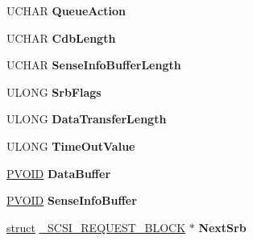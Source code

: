 \begin{DoxyCompactItemize}
U\+C\+H\+AR {\bfseries Queue\+Action}
\item 
\mbox{\label{struct___s_c_s_i___r_e_q_u_e_s_t___b_l_o_c_k_a5e64084a235d1162e8384fbf95c19304}} 
U\+C\+H\+AR {\bfseries Cdb\+Length}
\item 
\mbox{\label{struct___s_c_s_i___r_e_q_u_e_s_t___b_l_o_c_k_a3a9479a0667f96dd8bac70738a4e7a2c}} 
U\+C\+H\+AR {\bfseries Sense\+Info\+Buffer\+Length}
\item 
\mbox{\label{struct___s_c_s_i___r_e_q_u_e_s_t___b_l_o_c_k_ae175841aeb376125a20fbd7c4284d836}} 
U\+L\+O\+NG {\bfseries Srb\+Flags}
\item 
\mbox{\label{struct___s_c_s_i___r_e_q_u_e_s_t___b_l_o_c_k_a9375bacf3daa8bdd4a3a6d8bbcdde35f}} 
U\+L\+O\+NG {\bfseries Data\+Transfer\+Length}
\item 
\mbox{\label{struct___s_c_s_i___r_e_q_u_e_s_t___b_l_o_c_k_a206b7a18ee9ff76c165da4921c378527}} 
U\+L\+O\+NG {\bfseries Time\+Out\+Value}
\item 
\mbox{\label{struct___s_c_s_i___r_e_q_u_e_s_t___b_l_o_c_k_a40294e85339c4e9d60b66785c0459424}} 
\hyperlink{interfacevoid}{P\+V\+O\+ID} {\bfseries Data\+Buffer}
\item 
\mbox{\label{struct___s_c_s_i___r_e_q_u_e_s_t___b_l_o_c_k_a6f65421d840f698deecd5e5e8fc04e4c}} 
\hyperlink{interfacevoid}{P\+V\+O\+ID} {\bfseries Sense\+Info\+Buffer}
\item 
\mbox{\label{struct___s_c_s_i___r_e_q_u_e_s_t___b_l_o_c_k_ad55cd525e55371df4cec550549d2bdac}} 
\hyperlink{interfacestruct}{struct} \hyperlink{struct___s_c_s_i___r_e_q_u_e_s_t___b_l_o_c_k}{\+\_\+\+S\+C\+S\+I\+\_\+\+R\+E\+Q\+U\+E\+S\+T\+\_\+\+B\+L\+O\+CK} $\ast$ {\bfseries Next\+Srb}
\item 
\mbox{\label{struct___s_c_s_i___r_e_q_u_e_s_t___b_l_o_c_k_a381090e275e08725af0904e18d98ef80}} 

\end{DoxyCompactItemize}
